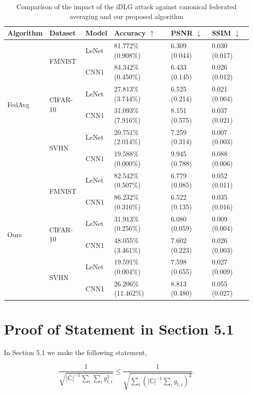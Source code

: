 \documentclass[conference,compsoc]{IEEEtran}
\begin{document}
\begin{table}[ht]
\centering
\caption{Comparison of the impact of the iDLG attack against canonical federated averaging and our proposed algorithm}
\label{table:idlg}
\begin{tabular}{llllll}
\hline
\textbf{Algorithm} & \textbf{Dataset} & \textbf{Model} & \textbf{Accuracy} $\uparrow$ & \textbf{PSNR} $\downarrow$ & \textbf{SSIM} $\downarrow$ \\
\hline
\multirow{6}{*}{FedAvg} & \multirow{2}{*}{FMNIST} & LeNet & 81.772\% (0.908\%) & 6.309 (0.044) & 0.030 (0.017) \\
& & CNN1 & 84.342\% (0.450\%) & 6.433 (0.145) & 0.026 (0.012) \\
\cline{2-6}
& \multirow{2}{*}{CIFAR-10} & LeNet & 27.813\% (3.744\%) & 6.525 (0.214) & 0.021 (0.004) \\
& & CNN1 & 31.093\% (7.916\%) & 8.151 (0.575) & 0.037 (0.021) \\
\cline{2-6}
& \multirow{2}{*}{SVHN} & LeNet & 20.751\% (2.014\%) & 7.259 (0.314) & 0.007 (0.003) \\
& & CNN1 & 19.588\% (0.000\%) & 9.945 (0.788) & 0.088 (0.006) \\
\hline
\multirow{6}{*}{Ours} & \multirow{2}{*}{FMNIST} & LeNet & 82.542\% (0.507\%) & 6.779 (0.085) & 0.052 (0.011) \\
& & CNN1 & 86.232\% (0.316\%) & 6.522 (0.135) & 0.035 (0.016) \\
\cline{2-6}
& \multirow{2}{*}{CIFAR-10} & LeNet & 31.913\% (0.256\%) & 6.080 (0.059) & 0.009 (0.004) \\
& & CNN1 & 48.055\% (3.461\%) & 7.602 (0.223) & 0.026 (0.003) \\
\cline{2-6}
& \multirow{2}{*}{SVHN} & LeNet & 19.591\% (0.004\%) & 7.598 (0.655) & 0.027 (0.009) \\
& & CNN1 & 26.206\% (11.462\%) & 8.813 (0.480) & 0.055 (0.027) \\
\hline
\end{tabular}
\end{table}


\section{Proof of Statement in Section 5.1}

In Section 5.1 we make the following statement,

\begin{equation*}
    \frac{1}{\sqrt{|\mathbb{C}|^{-1} \sum_t \sum_i g_{t, i}^2}} \leq \frac{1}{\sqrt{\sum_t (|\mathbb{C}|^{-1} \sum_i g_{t, i})^2}}.
\end{equation*}
\end{document}
